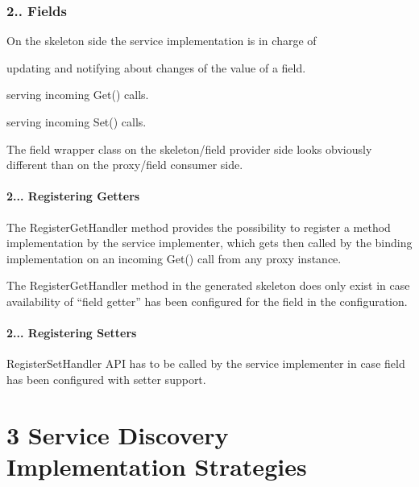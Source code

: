 \subsubsection*{2.. Fields}


\begin{DoxyItemize}
\item On the skeleton side the service implementation is in charge of
\begin{DoxyItemize}
\item updating and notifying about changes of the value of a field.
\item serving incoming Get() calls.
\item serving incoming Set() calls.
\end{DoxyItemize}
\item The field wrapper class on the skeleton/field provider side looks obviously different than on the proxy/field consumer side. 
\end{DoxyItemize}

\paragraph*{2... Registering Getters}


\begin{DoxyItemize}
\item The Register\+Get\+Handler method provides the possibility to register a method implementation by the service implementer, which gets then called by the binding implementation on an incoming Get() call from any proxy instance.
\item The Register\+Get\+Handler method in the generated skeleton does only exist in case availability of “field getter” has been configured for the field in the configuration.
\end{DoxyItemize}

\paragraph*{2... Registering Setters}


\begin{DoxyItemize}
\item Register\+Set\+Handler A\+PI has to be called by the service implementer in case field has been configured with setter support.
\end{DoxyItemize}

\section*{3 Service Discovery Implementation Strategies}


